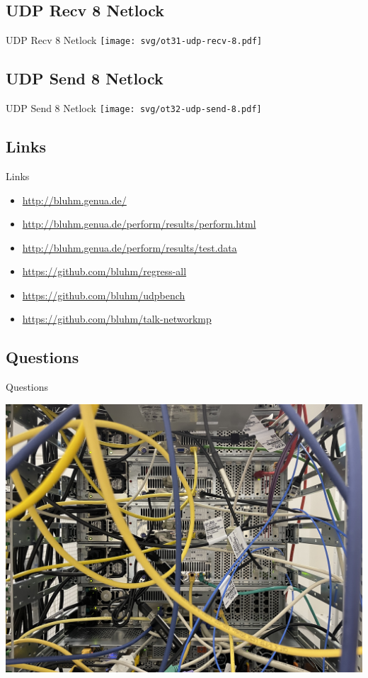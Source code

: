 \documentclass[14pt,aspectratio=169]{beamer}
\begin{document}
\subsection{UDP Recv 8 Netlock}
\begin{frame}{UDP Recv 8 Netlock}
    \texttt{[image: svg/ot31-udp-recv-8.pdf]}
\end{frame}

\subsection{UDP Send 8 Netlock}
\begin{frame}{UDP Send 8 Netlock}
    \texttt{[image: svg/ot32-udp-send-8.pdf]}
\end{frame}

\subsection{Links}
\begin{frame}{Links}
\begin{itemize}
    \small
    \item \url{http://bluhm.genua.de/}
    \item \url{http://bluhm.genua.de/perform/results/perform.html}
    \item \url{http://bluhm.genua.de/perform/results/test.data}
    \item \url{https://github.com/bluhm/regress-all}
    \item \url{https://github.com/bluhm/udpbench}
    \item \url{https://github.com/bluhm/talk-networkmp}
\end{itemize}
\end{frame}

\subsection{Questions}
\begin{frame}{Questions}
\begin{center}
    \includegraphics[width=\textwidth,clip]
        {images/lt13-ot14-ot15-lt16.jpg}
\end{center}
\end{frame}
\end{document}
